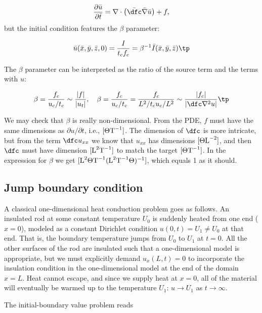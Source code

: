 \documentclass[graybox,envcountchap,sectrefs,final]{svmonodo}
\begin{document}
\begin{equation}
\frac{\partial \bar u}{\partial \bar t} =
\nabla\cdot\left(\bar\dfc \bar\nabla \bar u\right) + f,
\label{sec:scale:diffu:pde1:3D:d2}
\end{equation}
but the initial condition features the $\beta$ parameter:

\[ \bar u(\bar x, \bar y, \bar z, 0) = \frac{I}{t_cf_c} =
\beta^{-1}\bar I(\bar x,\bar y,\bar z)\tp
\]

The $\beta$ parameter can be interpreted as the ratio of the source
term and the terms with $u$:

\[ \beta = \frac{f_c}{u_c/t_c}\sim \frac{|f|}{|u_t|},\quad
\beta = \frac{f_c}{u_c/t_c} = \frac{f_c}{L^2/t_c u_c/L^2}\sim
\frac{|f_c|}{|\dfc\nabla^2 u|}\tp
\]

We may check that $\beta$ is really non-dimensional. From the PDE,
$f$ must have the same dimensions as $\partial u/\partial t$, i.e.,
$[\Theta\hbox{T}^{-1}]$.
The dimension of $\dfc$ is more intricate, but from the term
$\dfc u_{xx}$ we know that $u_{xx}$ has dimensions $[\Theta\hbox{L}^{-2}]$,
and then $\dfc$ must have dimension $[\hbox{L}^2\hbox{T}^{-1}]$
to match the target $[\Theta\hbox{T}^{-1}]$.
In the expression for $\beta$ we get
$[\hbox{L}^2\Theta\hbox{T}^{-1}(\hbox{L}^2\hbox{T}^{-1}\Theta)^{-1}]$,
which equals 1 as it should.


\subsection{Jump boundary condition}

A classical one-dimensional heat conduction problem goes as
follows. An insulated rod at some constant temperature $U_0$ is
suddenly heated from one end ($x=0$), modeled as a constant Dirichlet
condition $u(0,t)=U_1\neq U_0$ at that end. That is, the boundary
temperature jumps from $U_0$ to $U_1$ at $t=0$. All the other surfaces
of the rod are insulated such that a one-dimensional model is
appropriate, but we must explicitly demand $u_x(L,t)=0$ to incorporate
the insulation condition in the one-dimensional model at the end
of the domain $x=L$.  Heat cannot
escape, and since we supply heat at $x=0$, all of the material will
eventually be warmed up to the temperature $U_1$: $u\rightarrow U_1$
as $t\rightarrow\infty$.

The initial-boundary value problem reads
\end{document}
